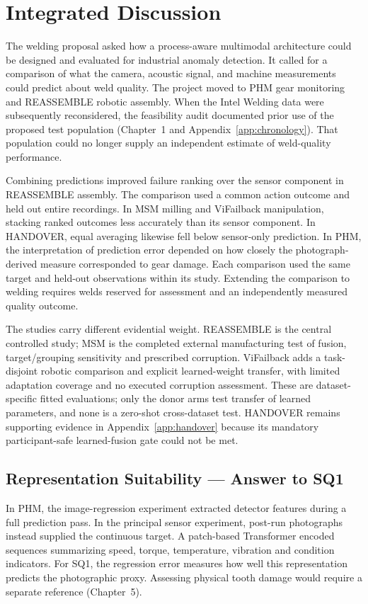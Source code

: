 \chapter{Integrated Discussion}
\label{ch:discussion}

The welding proposal asked how a process-aware multimodal architecture could be designed
and evaluated for industrial anomaly detection. It called for a comparison of what the
camera, acoustic signal, and machine measurements could predict about weld quality. The
project moved to PHM gear monitoring and REASSEMBLE robotic assembly. When the Intel
Welding data were subsequently reconsidered, the feasibility audit documented prior use
of the proposed test population (Chapter~1 and Appendix~\ref{app:chronology}). That
population could no longer supply an independent estimate of weld-quality performance.

Combining predictions improved failure ranking over the sensor component in REASSEMBLE
assembly. The comparison used a common action outcome and held out entire recordings. In
MSM milling and ViFailback manipulation, stacking ranked outcomes less accurately than
its sensor component. In HANDOVER, equal averaging likewise fell below sensor-only
prediction. In PHM, the interpretation of prediction error depended on how closely the
photograph-derived measure corresponded to gear damage. Each comparison used the same
target and held-out observations within its study. Extending the comparison to welding
requires welds reserved for assessment and an independently measured quality outcome.

The studies carry different evidential weight. REASSEMBLE is the central controlled
study; MSM is the completed external manufacturing test of fusion, target/grouping
sensitivity and prescribed corruption. ViFailback adds a task-disjoint robotic
comparison and explicit learned-weight transfer, with limited adaptation coverage and
no executed corruption assessment. These are dataset-specific fitted evaluations;
only the donor arms test transfer of learned parameters, and none is a zero-shot
cross-dataset test. HANDOVER remains supporting evidence in Appendix~\ref{app:handover}
because its mandatory participant-safe learned-fusion gate could not be met.

\section{Representation Suitability --- Answer to SQ1}
In PHM, the image-regression experiment extracted detector features during a full
prediction pass. In the principal sensor experiment, post-run photographs instead
supplied the continuous target. A patch-based Transformer encoded sequences summarizing
speed, torque, temperature, vibration and condition indicators. For SQ1, the regression
error measures how well this representation predicts the photographic proxy. Assessing
physical tooth damage would require a separate reference (Chapter~5).

